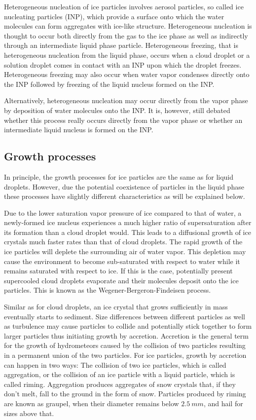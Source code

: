 Heterogeneous nucleation of ice particles involves aerosol particles, so called
ice nucleating particles (INP), which provide a surface onto which the water
molecules can form aggregates with ice-like structure. Heterogeneous nucleation
is thought to occur both directly from the gas to the ice phase as well as
indirectly through an intermediate liquid phase particle. Heterogeneous
freezing, that is heterogeneous nucleation from the liquid phase, occurs when a
cloud droplet or a solution droplet comes in contact with an INP upon which the
droplet freezes. Heterogeneous freezing may also occur when water vapor
condenses directly onto the INP followed by freezing of the liquid nucleus
formed on the INP.

Alternatively, heterogeneous nucleation may occur directly from the vapor phase
by deposition of water molecules onto the INP. It is, however, still debated
whether this process really occurs directly from the vapor phase or whether an
intermediate liquid nucleus is formed on the INP.

\subsection{Growth processes}

In principle, the growth processes for ice particles are the same as for liquid
droplets. However, due the potential coexistence of particles in the liquid
phase these processes have slightly different characteristics as will be
explained below.

Due to the lower saturation vapor pressure of ice compared to that of water, a
newly-formed ice nucleus experiences a much higher ratio of supersaturation
after its formation than a cloud droplet would. This leads to a  diffusional
growth of ice crystals much faster rates than that of cloud droplets.
The rapid growth of the ice particles will deplete the surrounding air of water
vapor. This depletion may cause the environment to become sub-saturated with
respect to water while it remains saturated with respect to ice. If this is the
case, potentially present supercooled cloud droplets evaporate and their
molecules deposit onto the ice particles. This is known as the
Wegener-Bergeron-Findeisen process.

Similar as for cloud droplets, an ice crystal that grows sufficiently in mass
eventually starts to sediment. Size differences between different particles as
well as turbulence may cause particles to collide and potentially stick together
to form larger particles thus initiating growth by accretion. Accretion is the
general term for the growth of hydrometeors caused by the collision of two
particles resulting in a permanent union of the two particles. For ice particles,
growth by accretion can happen in two ways: The collision of two ice particles,
which is called aggregation, or the collision of an ice particle with a liquid
particle, which is called riming. Aggregation produces aggregates of snow
crystals that, if they don't melt, fall to the ground in the form of snow.
Particles produced by riming are known as graupel, when their diameter remains
below $2.5\ \unit{mm}$, and hail for sizes above that.

